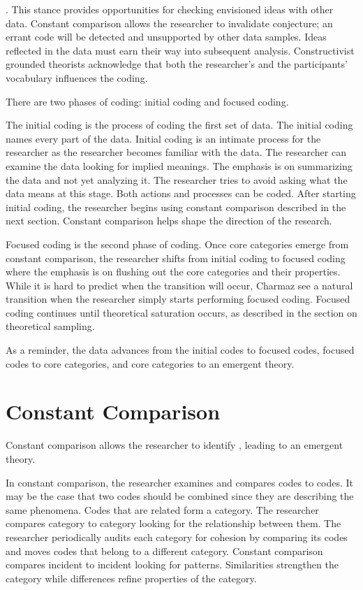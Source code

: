  \cite{Charmaz}. This stance provides opportunities for checking envisioned ideas with other data. Constant comparison allows the researcher to invalidate conjecture; an errant code will be detected and unsupported by other data samples. Ideas reflected in the data must earn their way into subsequent analysis. Constructivist grounded theorists acknowledge that both the researcher's and the participants' vocabulary influences the coding.

There are two phases of coding: initial coding and focused coding. 

The initial coding is the process of coding the first set of data. The initial coding names every part of the data. Initial coding is an intimate process for the researcher as the researcher becomes familiar with the data. The researcher can examine the data looking for implied meanings. The emphasis is on summarizing the data and not yet analyzing it. The researcher tries to avoid asking what the data means at this stage. Both actions and processes can be coded. After starting initial coding, the researcher begins using constant comparison described in the next section. Constant comparison helps shape the direction of the research. 

Focused coding is the second phase of coding. Once core categories emerge from constant comparison, the researcher shifts from initial coding to focused coding where the emphasis is on flushing out the core categories and their properties. While it is hard to predict when the transition will occur, Charmaz see a natural transition when the researcher simply starts performing focused coding. Focused coding continues until theoretical saturation occurs, as described in the section on theoretical sampling.

As a reminder, the data advances from the initial codes to focused codes, focused codes to core categories, and core categories to an emergent theory. 

\section{Constant Comparison}
Constant comparison allows the researcher to identify  \cite{GlaserBasics}, leading to an emergent theory.

In constant comparison, the researcher examines and compares codes to codes. It may be the case that two codes should be combined since they are describing the same phenomena. Codes that are related form a category. The researcher compares category to category looking for the relationship between them. The researcher periodically audits each category for cohesion by comparing its codes and moves codes that belong to a different category. Constant comparison compares incident to incident looking for patterns. Similarities strengthen the category while differences refine properties of the category. 

